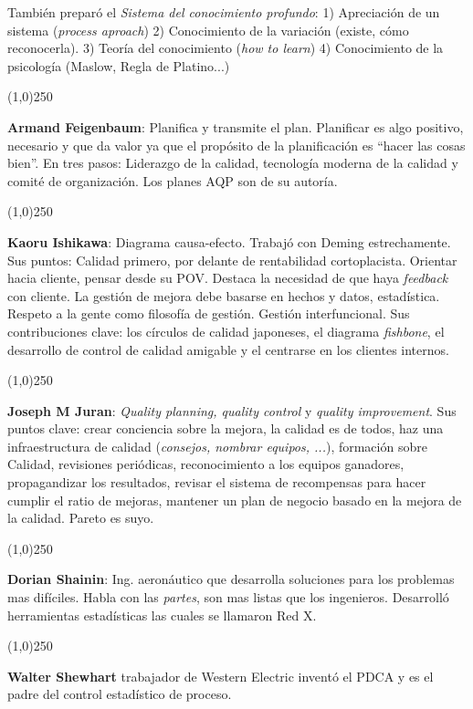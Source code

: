 \documentclass[]{article}
\begin{document}
También preparó el \textit{Sistema del conocimiento profundo}: 1) Apreciación de un sistema (\textit{process aproach}) 2) Conocimiento de la variación (existe, cómo reconocerla). 3) Teoría del conocimiento (\textit{how to learn}) 4) Conocimiento de la psicología (Maslow, Regla de Platino...) 
\begin{center}
	\line(1,0){250}
\end{center}
\textbf{Armand Feigenbaum}: Planifica y transmite el plan. Planificar es algo positivo, necesario y que da valor ya que el propósito de la planificación es ``hacer las cosas bien''. En tres pasos: Liderazgo de la calidad, tecnología moderna de la calidad y comité de organización. Los planes AQP son de su autoría. 
\begin{center}
	\line(1,0){250}
\end{center}
\textbf{Kaoru Ishikawa}: Diagrama causa-efecto. Trabajó con Deming estrechamente. Sus puntos: Calidad primero, por delante de rentabilidad cortoplacista. Orientar hacia cliente, pensar desde su POV. Destaca la necesidad de que haya \textit{feedback} con cliente. La gestión de mejora debe basarse en hechos y datos, estadística. Respeto a la gente como filosofía de gestión. Gestión interfuncional. Sus contribuciones clave: los círculos de calidad japoneses, el diagrama \textit{fishbone}, el desarrollo de control de calidad amigable y el centrarse en los clientes internos.
\begin{center}
	\line(1,0){250}
\end{center}
\textbf{Joseph M Juran}: \textit{Quality planning, quality control} y \textit{quality improvement}. Sus puntos clave: crear conciencia sobre la mejora, la calidad es de todos, haz una infraestructura de calidad (\textit{consejos, nombrar equipos, ...}), formación sobre Calidad, revisiones periódicas, reconocimiento a los equipos ganadores, propagandizar los resultados, revisar el sistema de recompensas para hacer cumplir el ratio de mejoras, mantener un plan de negocio basado en la mejora de la calidad. Pareto es suyo. 
\begin{center}
	\line(1,0){250}
\end{center}
\textbf{Dorian Shainin}: Ing. aeronáutico que desarrolla soluciones para los problemas mas difíciles. Habla con las \textit{partes}, son mas listas que los ingenieros. Desarrolló herramientas estadísticas las cuales se llamaron Red X.
\begin{center}
	\line(1,0){250}
\end{center}
\textbf{Walter Shewhart} trabajador de Western Electric inventó el PDCA y es el padre del control estadístico de proceso. 
\end{document}
